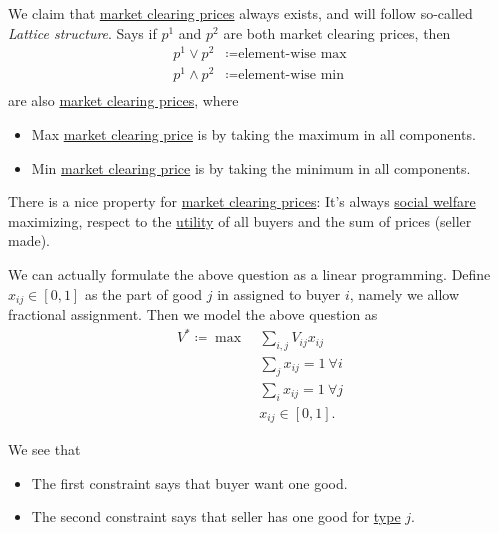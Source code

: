 We claim that \hyperref[note:market-clearing-prices]{market clearing prices} always exists, and will follow so-called \emph{Lattice structure}. Says if \(p^{1}\) and \(p^{2}\) are both market clearing prices, then
\[
	\begin{split}
		p^{1}\lor p^{2} &\coloneqq \text{element-wise max}\\
		p^{1}\land p^{2} &\coloneqq \text{element-wise min}\\
	\end{split}
\]
are also \hyperref[note:market-clearing-prices]{market clearing prices}, where
\begin{itemize}
	\item Max \hyperref[note:market-clearing-prices]{market clearing price} is by taking the maximum in all components.
	\item Min \hyperref[note:market-clearing-prices]{market clearing price} is by taking the minimum in all components.
\end{itemize}

\begin{remark}
	There is a nice property for \hyperref[note:market-clearing-prices]{market clearing prices}: It's always \hyperref[def:social-welfare]{social welfare}
	maximizing, respect to the \hyperref[def:reward]{utility} of all buyers and the sum of prices (seller made).
\end{remark}

We can actually formulate the above question as a linear programming. Define \(x_{ij} \in [0, 1]\) as the part of good \(j\) in assigned to buyer \(i\), namely we allow fractional assignment. Then we model the above question as
\[
	\begin{aligned}
		V^{\ast} \coloneqq \max~ & \sum\limits_{i, j}V_{ij}x_{ij}       \\
		                         & \sum\limits_{j}x_{ij} = 1\ \forall i \\
		                         & \sum\limits_{i}x_{ij} = 1\ \forall j \\
		                         & x_{ij}\in[0, 1].
	\end{aligned}
\]
\begin{intuition}
	We see that
	\begin{itemize}
		\item The first constraint says that buyer want one good.
		\item The second constraint says that seller has one good for \hyperref[def:type]{type} \(j\).
	\end{itemize}
\end{intuition}

